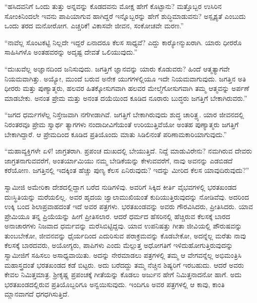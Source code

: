  “ಹಸಿದವನಿಗೆ ಒಂದು ತುತ್ತು ಅನ್ನವನ್ನು ಕೊಡದವನು ಮೋಕ್ಷ ಹೇಗೆ ಕೊಟ್ಟಾನು? ಮತ್ತೊಬ್ಬರ ಉಸಿರಿನ ಸೋಂಕಿನಿಂದಲೇ ಇವನು ಪಾಪಿಯಾಗುವ ಹಾಗಿದ್ದರೆ ಇನ್ನೊಬ್ಬರನ್ನು ಹೇಗೆ ಶುದ್ಧಿಮಾಡುವನು? ಅಸ್ಪೃಶ್ಯತೆ ಎಂಬುದು ಒಂದು ತರದ ಮನೋರೋಗ. ಎಚ್ಚರಿಕೆ! ವಿಕಾಸವೇ ಜೀವನ, ಸಂಕೋಚವೇ ಮರಣ.” 

 “ನಾವೆಲ್ಲ ಸೊಂಟಕಟ್ಟಿ ನಿಲ್ಲದೇ ಇದ್ದರೆ ಏನಾದರೂ ಕೆಲಸ ಸಾಧ್ಯವೆ? ಎದ್ದು ಕಾರ‍್ಯೋನ್ಮುಖ\-ರಾಗಿ. ಯಾರು ಧೀರರೊ ಸಾಹಿಸಿಗಳೊ ಅಂತಹವರನ್ನು ಅದೃಷ್ಟ ದೇವತೆ ಒಲಿಯುವುದು.” 

 “ದುಃಖವೆಲ್ಲ ಅಜ್ಞಾನದಿಂದ ಜನಿಸುವುದು. ಜಗತ್ತಿಗೆ ಜ್ಞಾನವನ್ನು ಯಾರು ಕೊಡುವರು? ಹಿಂದೆ ಆತ್ಮತ್ಯಾಗವೇ ನಿಯಮವಾಗಿತ್ತು. ಅಯ್ಯೋ, ಮುಂದೆ ಬರುವ ಅನೇಕ ಯುಗಗಳಲ್ಲಿಯೂ ಇದೇ ನಿಯಮವಾಗುವುದು. ಜಗತ್ತಿನ ಅತಿ ಧೀರರು ಮತ್ತು ಪುಣ್ಯಾತ್ಮರು, ಹಲವರ ಹಿತಕ್ಕೋಸುಗವಾಗಿ ಹಲವರ ಮೇಲ್ಮೆಗೋಸುಗವಾಗಿ ತಮ್ಮ ಆತ್ಮವನ್ನು ಅರ್ಪಣೆ ಮಾಡಬೇಕು. ಅನಂತ ಪ್ರೇಮ ಮತ್ತು ಅನಂತ ದಯೆಯಿಂದ ಕೂಡಿದ ನೂರಾರು ಬುದ್ಧರು ಜಗತ್ತಿಗೆ ಬೇಕಾಗಿರುವರು.” 

 “ಜಗದ ಧರ್ಮಗಳೆಲ್ಲ ನಿಸ್ತೇಜವಾಗಿ ನಗೆಗೀಡಾಗಿವೆ. ಜಗತ್ತಿಗೆ ಬೇಕಾಗಿರುವುದು ಶುದ್ಧ ಚಾರಿತ್ರ್ಯ. ಯಾರ ಜೀವನದಲ್ಲಿ ನಿರಂತರವೂ ಪ್ರೇಮ ಸ್ವಾರ್ಥ ತ್ಯಾಗಗಳು ನಂದಾದೀವಿಗೆಯಂತೆ ಉರಿಯುತ್ತಿವೆಯೋ ಅಂತಹ ಪುಣ್ಯಾತ್ಮರು ಜಗತ್ತಿಗೆ ಬೇಕಾಗಿದ್ದಾರೆ. ಆ ಪ್ರೇಮದಿಂದ ಕೂಡಿದ ಪ್ರತಿಯೊಂದು ಮಾತು ಸಿಡಿಲಿನಂತೆ ಪರಿಣಾಮಕಾರಿಯಾಗುವುದು.” 

 “ಮಹಾವ್ಯಕ್ತಿಗಳೇ ಏಳಿ! ಜಾಗ್ರತರಾಗಿ. ಪ್ರಪಂಚ ದುಃಖದಲ್ಲಿ ಬೇಯುತ್ತಿದೆ. ನಿದ್ದೆ ಮಾಡುವಿರೇನು? ನಮಗಿರುವ ದೇವರು ಜಾಗ್ರತನಾಗುವವರೆಗೆ, ಅಂತರ್ಯಾಮಿಯು ನಮ್ಮ ಬೇಡಿಕೆಯನ್ನು ಕೇಳುವವರೆಗೆ, ನಾವು ಅವನನ್ನು ಎಡಬಿಡದೆ ಕರೆಯೋಣ. ಜಗತ್ತಿನಲ್ಲಿ ಇದಕ್ಕಿಂತ ಹೆಚ್ಚು ಪುಣ್ಯ ಕೆಲಸ ಏನಿರುವುದು? ಇದನ್ನು ಮೀರಿದ ಕೆಲಸ ಯಾವುದಿರುವುದು?” 

 ಸ್ವಾಮೀಜಿ ಅಮೇರಿಕಾ ದೇಶದಲ್ಲಿದ್ದಾಗ ಬರೆದ ನುಡಿಗಳಿವು. ಅವರಿಗೆ ಸಿಕ್ಕಿದ ಕೀರ್ತಿ ವೈಭವಗಳಲ್ಲಿ ಭರತಖಂಡದ ದುಃಸ್ಥಿತಿಯನ್ನು ಮರೆಯಲಿಲ್ಲ. ಅವರ ಹೃದಯ ಜ್ವಾಲಾಮುಖಿಯಂತೆ ಕುದಿಯುತ್ತಿರುವುದನ್ನು ನೋಡಿವೆವು. ಅದರಿಂದ ಉಕ್ಕಿ ಬಂದ ಶಿಲಾಪ್ರವಾಹದಂತೆ ಇದೆ ಅವರ ಪತ್ರಗಳು. ಭರತಖಂಡವನ್ನು ಅವರು ಗೌರವಿಸಿದರು, ಪ್ರೀತಿಸಿದರು. ಯಾವ ಪ್ರೇಮಿಯೂ ತನ್ನ ಪ್ರಿಯೆಯನ್ನು ಹೀಗೆ ಪ್ರೀತಿಸಲಾರ. ಆದರೆ ಧರ್ಮದ ಹೆಸರಿನಲ್ಲಿ ಹೆಚ್ಚಿರುವ ಕೆಲಸಕ್ಕೆ ಬಾರದ ಅನಾಚಾರಗಳು ನಿಜವಾದ ಧರ್ಮವನ್ನು ಮರೆಸಿಬಿಟ್ಟಿದ್ದವು. ಯಾವ ಉಪನಿಷತ್ತು ಗೀತಾ ಜೀವಿಯಲ್ಲಿ ಪೌರುಷವನ್ನು ತುಂಬಬೇಕೋ, ಜೀವನವನ್ನು ಧೈರ್ಯದಿಂದ ಎದುರಿಸುವ ಪರಾಕ್ರಮವನ್ನು ಕೊಡಬೇಕೋ, ಅದನ್ನೆಲ್ಲ ಮರೆತು ನಾವು ಕೆಲಸಕ್ಕೆ ಬಾರದವರು, ಅಯೋಗ್ಯರು, ಪಾಪಿಗಳು ಎಂದು ಮೆಲ್ಲುತ್ತ ಅಧೋಗತಿಗೆ ಇಳಿದುಹೋಗುತ್ತಿರುವುದನ್ನು ಸ್ವಾಮೀಜಿಗೆ ಸಹಿಸಲು ಅಸಾಧ್ಯವಾಯಿತು. ಅದನ್ನು ನೇರಮಾಡಲು ಪತ್ರಗಳಲ್ಲಿ ತಮ್ಮ ಆ ವೇಗವನ್ನೆಲ್ಲ ಅಭಿಮಂತ್ರಿಸಿ ಮಹಾಸ್ತ್ರದಂತೆ ಭರತಖಂಡದ ಕಡೆ ಬಿಟ್ಟರು. ಅದು ಬರೆದದ್ದು ತಮ್ಮ ನೆಚ್ಚಿನ ಶಿಷ್ಯರಿಗೆ ಇರಬಹುದು. ಆದರೆ ಅವರು ಕೇವಲ ನಿಮಿತ್ತಮಾತ್ರ. ಶ‍್ರೀಕೃಷ್ಣ ಪ್ರಪಂಚಕ್ಕೆ ಗೀತೆಯನ್ನು ಕೊಡಲು ಅರ್ಜುನ ಹೇಗೆ ನಿಮಿತ್ತನಾದನೋ ಹಾಗೆ. ಅದು ಭರತಖಂಡದಲ್ಲಿರುವ ಪ್ರತಿಯೊಬ್ಬರಿಗೂ ಅನ್ವಯಿಸುವುದು. ಇಂದಿಗೂ ಅವರ ಪತ್ರಗಳಲ್ಲಿ ಆ ಕಾವು, ಕಾಂತಿ ಮ್ಲಾನವಾಗದೆ ಧಗಧಗಿಸುತ್ತಿದೆ. 

